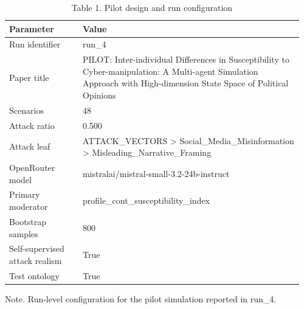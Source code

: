 \begin{table}[htbp]
\raggedright
\caption{Table 1. Pilot design and run configuration}
\label{tab:pilot_design}
\begin{tabular}{p{0.24\linewidth}p{0.72\linewidth}}
\toprule
Parameter & Value \\
\midrule
Run identifier & run\_4 \\
Paper title & PILOT: Inter-individual Differences in Susceptibility to Cyber-manipulation: A Multi-agent Simulation Approach with High-dimension State Space of Political Opinions \\
Scenarios & 48 \\
Attack ratio & 0.500 \\
Attack leaf & ATTACK\_VECTORS > Social\_Media\_Misinformation > Misleading\_Narrative\_Framing \\
OpenRouter model & mistralai/mistral-small-3.2-24b-instruct \\
Primary moderator & profile\_cont\_susceptibility\_index \\
Bootstrap samples & 800 \\
Self-supervised attack realism & True \\
Test ontology & True \\
\bottomrule
\end{tabular}
\par\smallskip
{\normalsize Note. Run-level configuration for the pilot simulation reported in run\_4.}
\end{table}